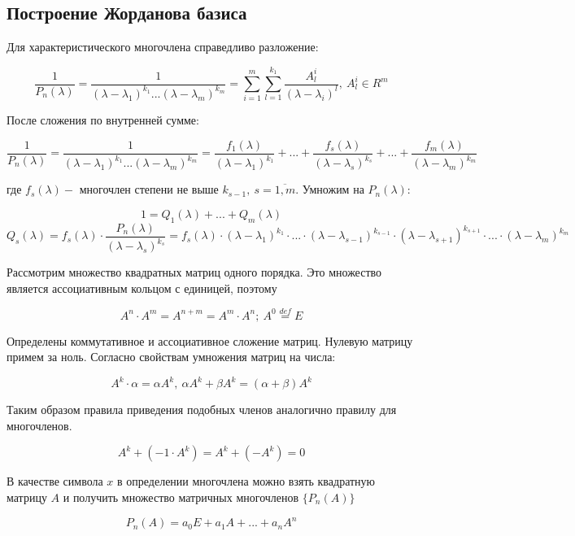 \documentclass[a4paper, 12pt]{article}
\begin{document}
\subsection{Построение Жорданова базиса}

Для характеристического многочлена справедливо разложение:

\[\frac{1}{P_n(\lambda)} = \frac{1}{(\lambda - \lambda_1)^{k_1}...(\lambda - \lambda_m)^{k_m}} = \sum\limits_{i = 1}^{m}{\sum\limits_{l=1}^{k_1}{\frac{A^i_l}{(\lambda - \lambda_i)^l}}},~ A^i_l \in R^m\]

После сложения по внутренней сумме:

\[\frac{1}{P_n(\lambda)} = \frac{1}{(\lambda - \lambda_1)^{k_1}...(\lambda - \lambda_m)^{k_m}} = \frac{f_1(\lambda)}{(\lambda-\lambda_1)^{k_1}} + ... + \frac{f_s(\lambda)}{(\lambda-\lambda_s)^{k_s}} + ... + \frac{f_m(\lambda)}{(\lambda-\lambda_m)^{k_m}}\]

где $f_s(\lambda) - $ многочлен степени не выше $k_{s-1},~ s = \overline{1,m}$. Умножим на $P_n(\lambda):$

\[1 = Q_1(\lambda) + ... + Q_m(\lambda)\]
\begin{equation}
Q_s(\lambda) = f_s(\lambda)\cdot\frac{P_n(\lambda)}{(\lambda - \lambda_s)^{k_s}} = f_s(\lambda)\cdot(\lambda - \lambda_1)^{k_1} \cdot ... \cdot (\lambda - \lambda_{s-1})^{k_{s-1}} \cdot (\lambda - \lambda_{s+1})^{k_{s+1}} \cdot ... \cdot (\lambda - \lambda_{m})^{k_{m}}
\label{20_1}
\end{equation}


Рассмотрим множество квадратных матриц одного порядка. Это множество является ассоциативным кольцом с единицей, поэтому

\[A^n \cdot A^m = A^{n+m} = A^m \cdot A^n;~ A^0 \stackrel{def}{=} E\]

Определены коммутативное и ассоциативное сложение матриц. Нулевую матрицу примем за ноль. Согласно свойствам умножения матриц на числа:

\[A^k \cdot \alpha = \alpha A^k,~ \alpha A^k + \beta A^k = (\alpha + \beta) A^k\]

Таким образом правила приведения подобных членов аналогично правилу для многочленов.

\[A^k + (-1 \cdot A^k) = A^k + (-A^k) = 0\]

В качестве символа $x$ в определении многочлена можно взять квадратную матрицу $A$ и получить множество матричных многочленов $\{P_n(A)\}$

\[P_n(A) = a_0 E + a_1 A + ... + a_n A^n\]
\end{document}
